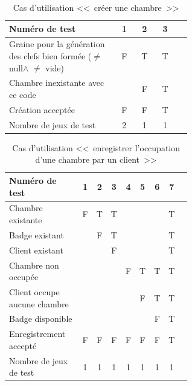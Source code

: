\documentclass[11pt,article]{article}
\newcommand{\nullvalue}{\textsf{null}\xspace}
\begin{document}
\begin{table}[htbp!]
\begin{tabular}{|p{0.6\linewidth}|c|c|c|c|}
\hline
Numéro de test
&1&2&3\\
\hline

\hline
Graine pour la génération des clefs bien formée ($\neq$ \nullvalue $\land$ $\neq$ vide)
&F&T&T\\
\hline
Chambre inexistante avec ce code
& &F&T\\
\hline
\hline
Création acceptée
&F&F&T\\
\hline
\hline
Nombre de jeux de test
&2&1&1\\
\hline
\end{tabular}
\caption{Cas d'utilisation <<~créer une chambre~>>}
\end{table}
        \begin{table}[htbp!]
            \begin{tabular}{|p{0.6\linewidth}|c|c|c|c|c|c|c|c|}
                \hline
                Numéro de test
                    &1&2&3&4&5&6&7\\

                \hline
                Chambre existante
                    &F&T&T& & & &T\\
                \hline
                Badge existant
                    & &F&T& & & &T\\
				\hline
                Client existant
                    & & &F& & & &T\\
                \hline
                \hline
                Chambre non occupée
                    & & & &F&T&T&T\\
                \hline
				\hline
				Client occupe aucune chambre
					& & & & &F&T&T\\
				\hline
				\hline
				Badge disponible
					& & & & & &F&T\\
                \hline
                \hline
                Enregistrement accepté
                    &F&F&F&F&F&F&T\\
                \hline
                \hline
                Nombre de jeux de test
                                    &1&1&1&1&1&1&1\\
                \hline
            \end{tabular}
            \caption{Cas d'utilisation <<~enregistrer l'occupation d'une chambre par un client~>>}
        \end{table}
\end{document}
